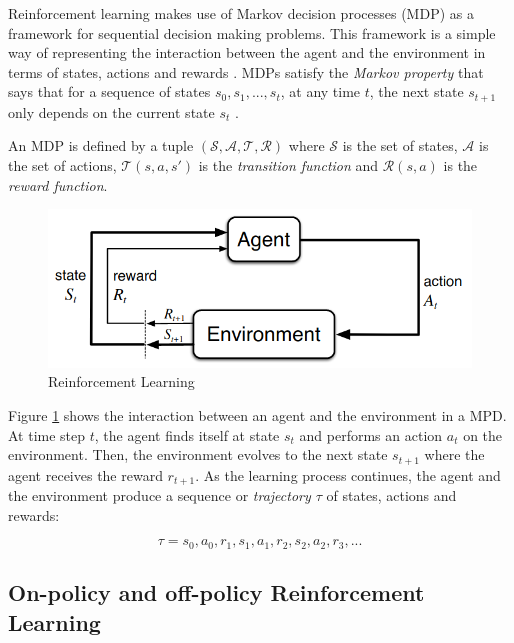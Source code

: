 Reinforcement learning makes use of Markov decision processes (MDP) as a framework for sequential decision making problems. This framework is a simple way of representing the interaction between the agent and the environment in terms of states, actions and rewards \cite{Sutton:1998}. MDPs satisfy the \textit{Markov property} that says that for a sequence of states $s_0, s_1, ..., s_t$, at any time $t$, the next state $s_{t+1}$ only depends on the current state $s_t$ \cite{Osa:2018}.

An MDP is defined by a tuple $(\mathcal{S}, \mathcal{A}, \mathcal{T}, \mathcal{R})$ where $\mathcal{S}$ is the set of states, $\mathcal{A}$ is the set of actions, $\mathcal{T}(s, a, s')$ is the \textit{transition function} and $\mathcal{R}(s, a)$ is the \textit{reward function}.

\begin{figure}[H]
    \centering
    \includegraphics[width=.7\textwidth]{figures/reinforcement_learning.png}
    \caption{Reinforcement Learning}
    \label{fig:reinforcement_learning}
\end{figure}

Figure \ref{fig:reinforcement_learning} shows the interaction between an agent and the environment in a MPD. At time step $t$, the agent finds itself at state $s_t$ and performs an action $a_t$ on the environment. Then, the environment evolves to the next state $s_{t+1}$ where the agent receives the reward $r_{t+1}$. As the learning process continues, the agent and the environment produce a sequence or \textit{trajectory $\tau$} of states, actions and rewards:


\begin{equation}
\tau = s_0, a_0, r_1,s_1, a_1, r_2,s_2, a_2, r_3, ...
\label{eq:value-function}
\end{equation}


\subsection{On-policy and off-policy Reinforcement Learning}
\label{subsection:on and off-policy Reinforcement Learning}

